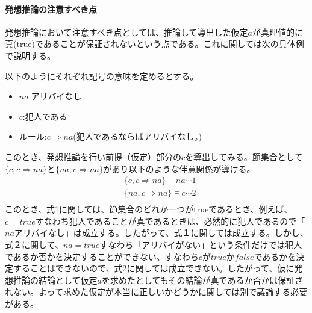 \documentclass[dvipdfmx]{jsarticle}
\begin{document}
\paragraph{発想推論の注意すべき点}
発想推論において注意すべき点としては、推論して導出した仮定$a$が真理値的に真(true)であることが保証されないという点である。これに関しては次の具体例で説明する。\par
以下のようにそれぞれ記号の意味を定めるとする。
\begin{itemize}
  \item $na$:アリバイなし
  \item $c$:犯人である
  \item ルール:$c \Rightarrow na$(犯人であるならばアリバイなし。)
\end{itemize}
このとき、発想推論を行い前提（仮定）部分の$c$を導出してみる。節集合として$\{ c, c \Rightarrow na\}$と$\{ na, c \Rightarrow na\}$があり以下のような伴意関係が導ける。
\begin{align*}
  & \{c, c \Rightarrow na\} \models na  \cdots 1 \\
  & \{ na, c \Rightarrow na\} \models c \cdots 2 \\
\end{align*}
このとき、式1に関しては、節集合のどれか一つがtrueであるとき、例えば、$c = true$すなわち犯人であることが真であるときは、必然的に犯人であるので「$na$アリバイなし」は成立する。したがって、式１に関しては成立する。しかし、式２に関して、$na = true$すなわち「アリバイがない」という条件だけでは犯人であるか否かを決定することができない、すなわち$c$が$true$か$false$であるかを決定することはできないので、式2に関しては成立できない。したがって、仮に発想推論の結論として仮定$a$を求めたとしてもその結論が真であるか否かは保証されない。よって求めた仮定が本当に正しいかどうかに関しては別で議論する必要がある。
\end{document}
